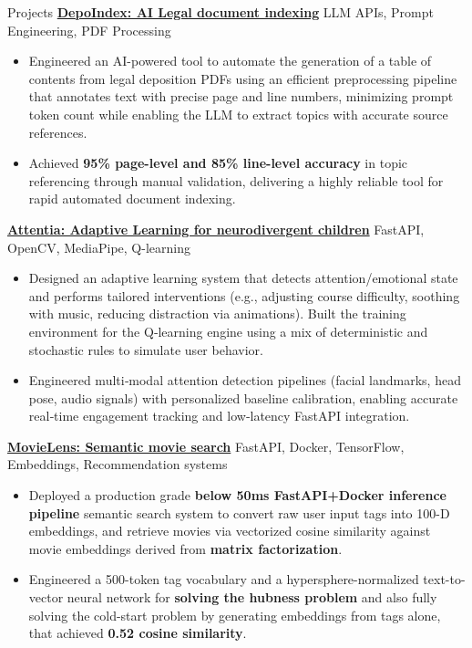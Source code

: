 \documentclass{resume}
\begin{document}
\begin{rSection}{Projects}
     {\large \textbf{\href{https://github.com/Bharat269/DepoIndex}{ DepoIndex: AI Legal document indexing}}} LLM APIs, Prompt Engineering, PDF Processing 
    \begin{itemize}
    \item  Engineered an AI-powered tool to automate the generation of a table of contents from legal deposition PDFs using  an efficient preprocessing pipeline that annotates text with precise page and line numbers, minimizing prompt token count while enabling the LLM to extract topics with accurate source references. 
\item Achieved \textbf{95\% page-level and 85\% line-level accuracy} in topic referencing through manual validation, delivering a highly reliable tool for rapid automated document indexing. 
    \end{itemize}
    {\large \href{https://github.com/fzzm05/attentia.ai}{\textbf{Attentia:  Adaptive Learning for neurodivergent children}}} FastAPI, OpenCV, MediaPipe, Q-learning
    \begin{itemize}
    \item Designed an adaptive learning system that detects attention/emotional state and performs tailored interventions (e.g., adjusting course difficulty, soothing with music, reducing distraction via animations). Built the training environment for the Q‑learning engine using a mix of deterministic and stochastic rules to simulate user behavior.
    \item Engineered multi‑modal attention detection pipelines (facial landmarks, head pose, audio signals) with personalized baseline calibration, enabling accurate real‑time engagement tracking and low‑latency FastAPI integration. 
    \end{itemize}
    {\large \href{https://github.com/Bharat269/MovieMix}{\textbf{MovieLens: Semantic movie search}}} FastAPI, Docker, TensorFlow, Embeddings, Recommendation systems
    \begin{itemize}
    \item  Deployed a production grade \textbf{below 50ms FastAPI+Docker inference pipeline}  semantic search system to convert raw user input tags into 100-D embeddings, and retrieve movies via vectorized cosine similarity against movie embeddings derived from \textbf{ matrix factorization}.
    \item Engineered a 500-token tag vocabulary and a hypersphere-normalized text-to-vector neural network for \textbf{solving the hubness problem} and also fully solving the cold-start problem by generating embeddings from tags alone, that achieved \textbf{ 0.52 cosine similarity}.

\end{itemize}
\end{rSection}
\end{document}
